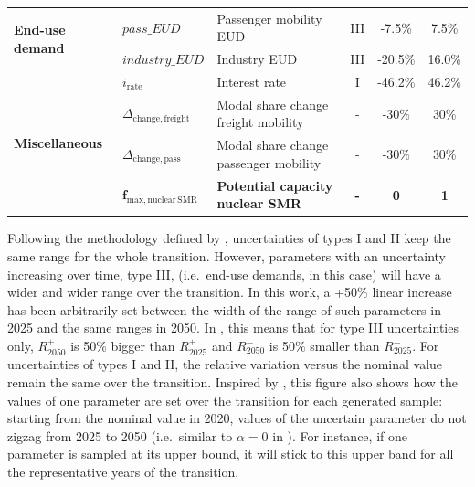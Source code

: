 \documentclass[11pt,twoside,a4paper,english]{article}
\def\ie{i.e.\ }
\begin{document}
\begin{table}[htbp]
{\begin{tabular}{l l l c c c}
\multirow{2}{*}{\textbf{End-use demand}} & $pass\_EUD$ & Passenger mobility EUD & III & -7.5\% & 7.5\% \\
& $industry\_EUD$ & Industry EUD & III & -20.5\% & 16.0\% \\
\midrule

\multirow{4}{*}{\textbf{Miscellaneous}} &$i_{\mathrm{rate}}$  & Interest rate & I & -46.2\% & 46.2\% \\
& $\Delta_{\mathrm{change,freight}}$ & Modal share change freight mobility & - & -30\% & 30\% \\
& $\Delta_{\mathrm{change,pass}}$ & Modal share change passenger mobility & - & -30\% & 30\% \\
& $\bm{f_{\mathrm{max,nuclear\,SMR}}}$ & \textbf{Potential capacity nuclear SMR} & \textbf{-} & \textbf{0} & \textbf{1} \\

\bottomrule							

\end{tabular}}
\end{table}

Following the methodology defined by \citet{Moret2017}, uncertainties of types I and II keep the same range for the whole transition. However, parameters with an uncertainty increasing over time, type III, (\ie end-use demands, in this case) will have a wider and wider range over the transition. In this work, a +50\% linear increase has been arbitrarily set between the width of the range of such parameters in 2025 and the same ranges in 2050. In , this means that for type III uncertainties only, $R_{2050}^+$ is 50\% bigger than $R_{2025}^+$ and $R_{2050}^-$ is 50\% smaller than $R_{2025}^-$. For uncertainties of types I and II, the relative variation versus the nominal value remain the same over the transition. Inspired by \citet{guevara2022modeling}, this figure also shows how the values of one parameter are set over the transition for each generated sample: starting from the nominal value in 2020, values of the uncertain parameter do not zigzag from 2025 to 2050 (\ie similar to $\alpha=0$ in \cite{guevara2022modeling}). For instance, if one parameter is sampled at its upper bound, it will stick to this upper band for all the representative years of the transition.
\end{document}

